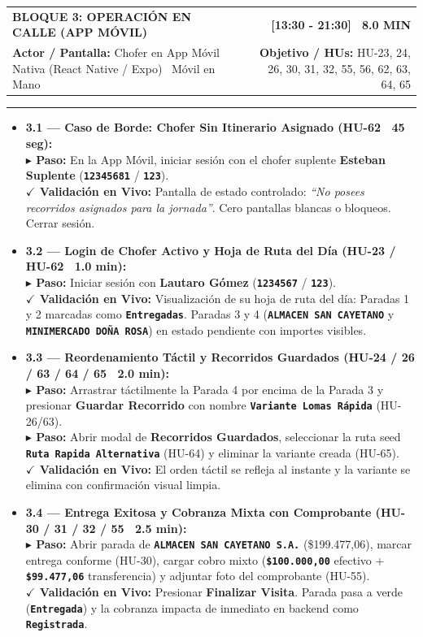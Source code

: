 \documentclass[a4paper,9pt]{article}
\makeatletter
\newcommand{\stepact}[1]{\textbf{$\blacktriangleright$ Paso:} #1}
\newcommand{\valact}[1]{\textbf{$\checkmark$ Validación en Vivo:} #1}
\newcommand{\codeb}[1]{\texttt{\bfseries #1}}
\newcommand{\blockheader}[4]{%
  \begin{tabularx}{\textwidth}{@{}X r@{}}
    {\fontsize{10.5pt}{12.5pt}\selectfont\textbf{#1}} & {\normalsize\textbf{#2}} \\
    {\footnotesize\textbf{Actor / Pantalla:} #3} & {\footnotesize\textbf{Objetivo / HUs:} #4}
  \end{tabularx}%
  \vspace{-2pt}\hrule\vspace{3.5pt}%
}
\makeatother
\begin{document}
\begin{tcolorbox}[cardframe, top=3pt, bottom=3pt, left=6pt, right=6pt]
\blockheader{BLOQUE 3: OPERACIÓN EN CALLE (APP MÓVIL)}{[13:30 - 21:30] \textbar\ 8.0 MIN}{Chofer en App Móvil Nativa (React Native / Expo) \textbar\ Móvil en Mano}{HU-23, 24, 26, 30, 31, 32, 55, 56, 62, 63, 64, 65}

{\small
\begin{itemize}[leftmargin=11pt, itemsep=4pt]

\item \textbf{3.1 — Caso de Borde: Chofer Sin Itinerario Asignado (HU-62 \textbar\ 45 seg):} \\
\stepact{En la App Móvil, iniciar sesión con el chofer suplente \textbf{Esteban Suplente} (\codeb{12345681} / \codeb{123}).} \\
\valact{Pantalla de estado controlado: \textit{``No posees recorridos asignados para la jornada''}. Cero pantallas blancas o bloqueos. Cerrar sesión.}

\item \textbf{3.2 — Login de Chofer Activo y Hoja de Ruta del Día (HU-23 / HU-62 \textbar\ 1.0 min):} \\
\stepact{Iniciar sesión con \textbf{Lautaro Gómez} (\codeb{1234567} / \codeb{123}).} \\
\valact{Visualización de su hoja de ruta del día: Paradas 1 y 2 marcadas como \codeb{Entregadas}. Paradas 3 y 4 (\codeb{ALMACEN SAN CAYETANO} y \codeb{MINIMERCADO DOÑA ROSA}) en estado pendiente con importes visibles.}

\item \textbf{3.3 — Reordenamiento Táctil y Recorridos Guardados (HU-24 / 26 / 63 / 64 / 65 \textbar\ 2.0 min):} \\
\stepact{Arrastrar táctilmente la Parada 4 por encima de la Parada 3 y presionar \textbf{Guardar Recorrido} con nombre \codeb{Variante Lomas Rápida} (HU-26/63).} \\
\stepact{Abrir modal de \textbf{Recorridos Guardados}, seleccionar la ruta seed \codeb{Ruta Rapida Alternativa} (HU-64) y eliminar la variante creada (HU-65).} \\
\valact{El orden táctil se refleja al instante y la variante se elimina con confirmación visual limpia.}

\item \textbf{3.4 — Entrega Exitosa y Cobranza Mixta con Comprobante (HU-30 / 31 / 32 / 55 \textbar\ 2.5 min):} \\
\stepact{Abrir parada de \codeb{ALMACEN SAN CAYETANO S.A.} (\$199.477,06), marcar entrega conforme (HU-30), cargar cobro mixto (\codeb{\$100.000,00} efectivo + \codeb{\$99.477,06} transferencia) y adjuntar foto del comprobante (HU-55).} \\
\valact{Presionar \textbf{Finalizar Visita}. Parada pasa a verde (\codeb{Entregada}) y la cobranza impacta de inmediato en backend como \codeb{Registrada}.}


\end{itemize}}
\end{tcolorbox}
\end{document}
